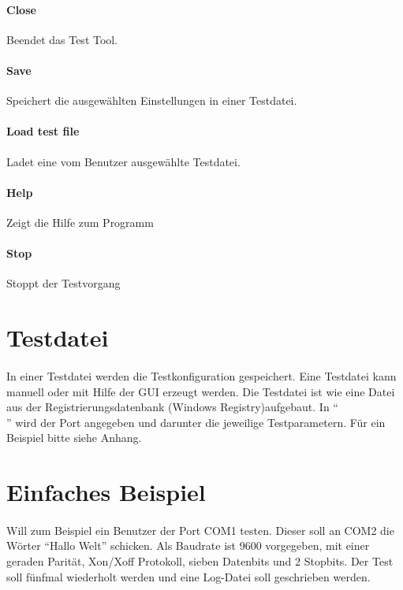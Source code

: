 \paragraph{Close} Beendet das Test Tool.
\paragraph{Save} Speichert die ausgewählten Einstellungen in einer Testdatei.
\paragraph{Load test file} Ladet eine vom Benutzer ausgewählte Testdatei.
\paragraph{Help} Zeigt die Hilfe zum Programm
\paragraph{Stop} Stoppt der Testvorgang



\section{Testdatei}
\paragraph{}
In einer Testdatei werden die Testkonfiguration gespeichert. Eine Testdatei kann manuell oder mit Hilfe der GUI erzeugt werden. Die Testdatei ist wie eine Datei aus der Registrierungsdatenbank (Windows Registry)aufgebaut. In "`\[\]"' wird der Port angegeben und darunter die jeweilige Testparametern. Für ein Beispiel bitte siehe Anhang. 

\section{Einfaches Beispiel}
\paragraph{}
Will zum Beispiel ein Benutzer der Port COM1 testen. Dieser soll an COM2 die Wörter "`Hallo Welt"' schicken. Als Baudrate ist 9600 vorgegeben, mit einer geraden Parität, Xon/Xoff Protokoll, sieben Datenbits und 2 Stopbits. Der Test soll fünfmal wiederholt werden und eine Log-Datei soll geschrieben werden.

